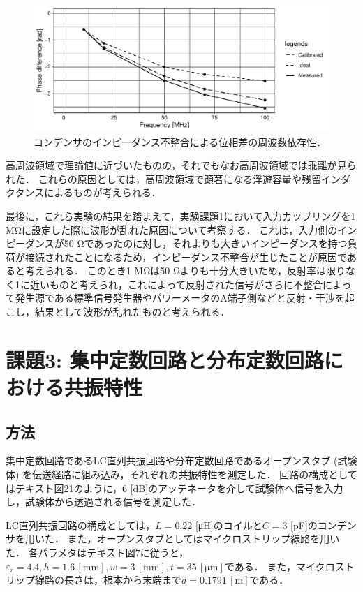 \documentclass[uplatex,dvipdfmx,a4j,12pt]{jsarticle}
\begin{document}
\begin{figure}[H]
  \centering
  \includegraphics[width=\linewidth]{data/2_2/phase_diff2.pdf}
  \caption{コンデンサのインピーダンス不整合による位相差の周波数依存性．}
  \label{fig:2-6}
\end{figure}

高周波領域で理論値に近づいたものの，それでもなお高周波領域では乖離が見られた．
これらの原因としては，高周波領域で顕著になる浮遊容量や残留インダクタンスによるものが考えられる．

最後に，これら実験の結果を踏まえて，実験課題1において入力カップリングを1 \si{\mega \ohm}に設定した際に波形が乱れた原因について考察する．
これは，入力側のインピーダンスが50 \si{\ohm}であったのに対し，それよりも大きいインピーダンスを持つ負荷が接続されたことになるため，インピーダンス不整合が生じたことが原因であると考えられる．
このとき1 \si{\mega \ohm}は50 \si{\ohm}よりも十分大きいため，反射率は限りなく1に近いものと考えられ，これによって反射された信号がさらに不整合によって発生源である標準信号発生器やパワーメータのA端子側などと反射・干渉を起こし，結果として波形が乱れたものと考えられる．

\section{課題3: 集中定数回路と分布定数回路における共振特性}
\subsection{方法}
集中定数回路であるLC直列共振回路や分布定数回路であるオープンスタブ (試験体) を伝送経路に組み込み，それぞれの共振特性を測定した．
回路の構成としてはテキスト図21のように，6 [dB]のアッテネータを介して試験体へ信号を入力し，試験体から透過される信号を測定した．

LC直列共振回路の構成としては，$L = 0.22$ [\si{\micro \henry}]のコイルと$C = 3$ [\si{\pico \farad}]のコンデンサを用いた． 
また，オープンスタブとしてはマイクロストリップ線路を用いた．
各パラメタはテキスト図7に従うと，$\varepsilon_r = 4.4, h = 1.6\mathrm{\,[mm]}, w = 3\mathrm{\,[mm]}, t = 35\mathrm{\,[\mu m]}$である．
また，マイクロストリップ線路の長さは，根本から末端まで$d = 0.1791\mathrm{\,[m]}$である．
\end{document}

